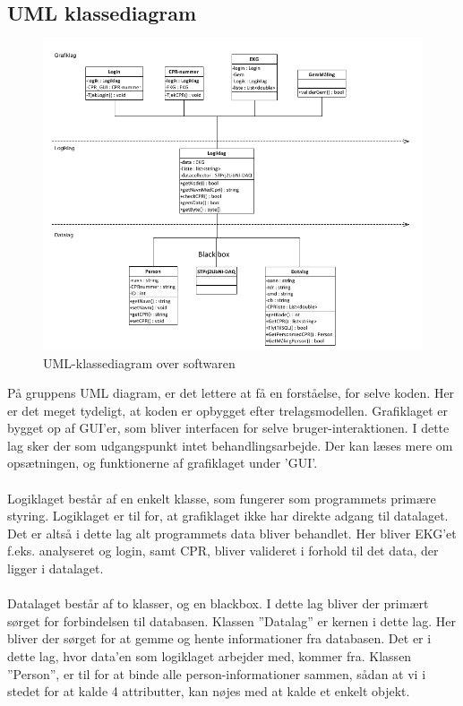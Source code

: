 \subsection{UML klassediagram}

\begin{figure}[H]
	\centering
	\includegraphics[width=1\textwidth]{Figurer/Snip20150430_42}
	\caption{UML-klassediagram over softwaren}
\end{figure}

På gruppens UML diagram, er det lettere at få en forståelse, for selve koden. Her er det meget tydeligt, at koden er opbygget efter trelagsmodellen. Grafiklaget er bygget op af GUI’er, som bliver interfacen for selve bruger-interaktionen. I dette lag sker der som udgangspunkt intet behandlingsarbejde. Der kan læses mere om opsætningen, og funktionerne af grafiklaget under ’GUI’.\\ \\
Logiklaget består af en enkelt klasse, som fungerer som programmets primære styring. Logiklaget er til for, at grafiklaget ikke har direkte adgang til datalaget. Det er altså i dette lag alt programmets data bliver behandlet.  Her bliver EKG’et f.eks. analyseret og login, samt CPR, bliver valideret i forhold til det data, der ligger i datalaget. \\ \\
Datalaget består af to klasser, og en blackbox. I dette lag bliver der primært sørget for forbindelsen til databasen. Klassen ”Datalag” er kernen i dette lag. Her bliver der sørget for at gemme og hente informationer fra databasen. Det er i dette lag, hvor data’en som logiklaget arbejder med, kommer fra. Klassen ”Person”, er til for at binde alle person-informationer sammen, sådan at vi i stedet for at kalde 4 attributter, kan nøjes med at kalde et enkelt objekt. 

